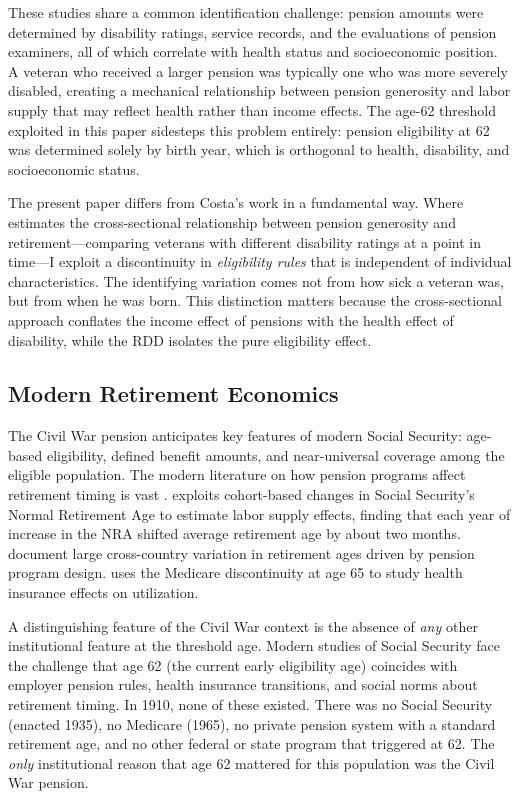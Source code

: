 \documentclass[12pt]{article}
\begin{document}
These studies share a common identification challenge: pension amounts were determined by disability ratings, service records, and the evaluations of pension examiners, all of which correlate with health status and socioeconomic position. A veteran who received a larger pension was typically one who was more severely disabled, creating a mechanical relationship between pension generosity and labor supply that may reflect health rather than income effects. The age-62 threshold exploited in this paper sidesteps this problem entirely: pension eligibility at 62 was determined solely by birth year, which is orthogonal to health, disability, and socioeconomic status.

The present paper differs from Costa's work in a fundamental way. Where \citet{costa1995pensions} estimates the cross-sectional relationship between pension generosity and retirement---comparing veterans with different disability ratings at a point in time---I exploit a discontinuity in \textit{eligibility rules} that is independent of individual characteristics. The identifying variation comes not from how sick a veteran was, but from when he was born. This distinction matters because the cross-sectional approach conflates the income effect of pensions with the health effect of disability, while the RDD isolates the pure eligibility effect.

\subsection{Modern Retirement Economics}

The Civil War pension anticipates key features of modern Social Security: age-based eligibility, defined benefit amounts, and near-universal coverage among the eligible population. The modern literature on how pension programs affect retirement timing is vast \citep[see][for a review]{dalen2010old}. \citet{mastrobuoni2009labor} exploits cohort-based changes in Social Security's Normal Retirement Age to estimate labor supply effects, finding that each year of increase in the NRA shifted average retirement age by about two months. \citet{gruber1999social} document large cross-country variation in retirement ages driven by pension program design. \citet{card2008impact} uses the Medicare discontinuity at age 65 to study health insurance effects on utilization.

A distinguishing feature of the Civil War context is the absence of \textit{any} other institutional feature at the threshold age. Modern studies of Social Security face the challenge that age 62 (the current early eligibility age) coincides with employer pension rules, health insurance transitions, and social norms about retirement timing. In 1910, none of these existed. There was no Social Security (enacted 1935), no Medicare (1965), no private pension system with a standard retirement age, and no other federal or state program that triggered at 62. The \textit{only} institutional reason that age 62 mattered for this population was the Civil War pension.
\end{document}
